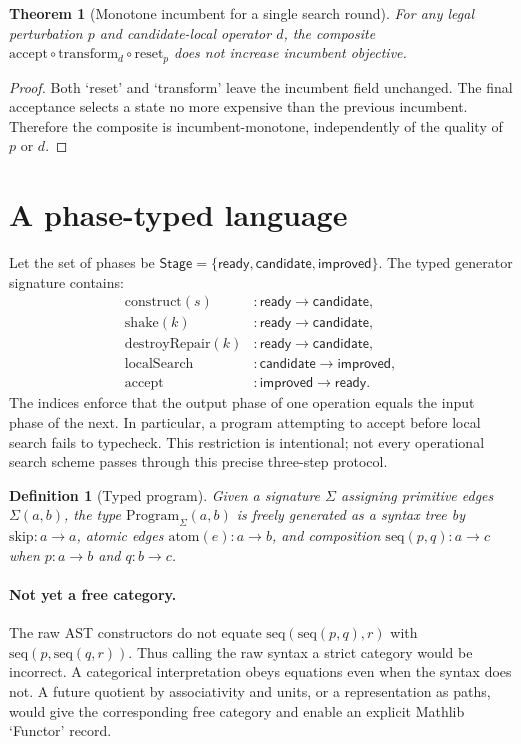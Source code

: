 \documentclass[11pt,a4paper]{article}
\newtheorem{definition}{Definition}
\newtheorem{theorem}{Theorem}
\begin{document}
\begin{theorem}[Monotone incumbent for a single search round]
For any legal perturbation $p$ and candidate-local operator $d$, the
composite $\mathrm{accept}\circ\mathrm{transform}_{d}\circ
\mathrm{reset}_{p}$ does not increase incumbent objective.
\end{theorem}
\begin{proof}
Both `reset' and `transform' leave the incumbent field unchanged.
The final acceptance selects a state no more expensive than the previous
incumbent. Therefore the composite is incumbent-monotone, independently of
the quality of $p$ or $d$.
\end{proof}

\section{A phase-typed language}
Let the set of phases be
$\mathsf{Stage}=\{\mathsf{ready},\mathsf{candidate},\mathsf{improved}\}$.
The typed generator signature contains:
\begin{align*}
 \mathrm{construct}(s)&:\mathsf{ready}\to\mathsf{candidate},\\
 \mathrm{shake}(k)&:\mathsf{ready}\to\mathsf{candidate},\\
 \mathrm{destroyRepair}(k)&:\mathsf{ready}\to\mathsf{candidate},\\
 \mathrm{localSearch}&:\mathsf{candidate}\to\mathsf{improved},\\
 \mathrm{accept}&:\mathsf{improved}\to\mathsf{ready}.
\end{align*}
The indices enforce that the output phase of one operation equals the input
phase of the next. In particular, a program attempting to accept before
local search fails to typecheck. This restriction is intentional; not every
operational search scheme passes through this precise three-step protocol.

\begin{definition}[Typed program]
Given a signature $\Sigma$ assigning primitive edges $\Sigma(a,b)$, the
type $\mathrm{Program}_{\Sigma}(a,b)$ is freely generated as a syntax tree
by $\mathrm{skip}:a\to a$, atomic edges
$\mathrm{atom}(e):a\to b$, and composition
$\mathrm{seq}(p,q):a\to c$ when $p:a\to b$ and $q:b\to c$.
\end{definition}

\paragraph{Not yet a free category.}
The raw AST constructors do not equate
$\mathrm{seq}(\mathrm{seq}(p,q),r)$ with
$\mathrm{seq}(p,\mathrm{seq}(q,r))$.
Thus calling the raw syntax a strict category would be incorrect.
A categorical interpretation obeys equations even when the syntax does not.
A future quotient by associativity and units, or a representation as paths,
would give the corresponding free category and enable an explicit Mathlib
`Functor' record.
\end{document}
